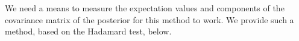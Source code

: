 \documentclass[aps,amsmath,onecolumn,amssymb,notitlepage]{revtex4-1}
\begin{document}

We need a means to measure the expectation values and components of the covariance matrix of the posterior for this method to work.  We provide such a method, based on the Hadamard test,  below.
\end{document}
